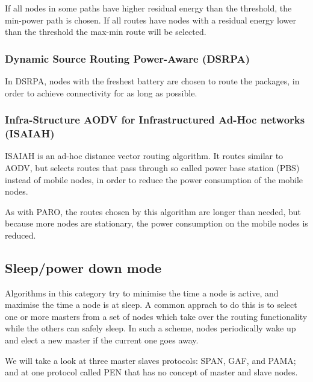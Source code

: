 \documentclass[conference]{IEEEtran}
\begin{document}
If all nodes in some paths have higher residual energy than the threshold,
the min-power path is chosen.
If all routes have nodes with a residual energy lower than the threshold the
max-min route will be selected.

\subsubsection{Dynamic Source Routing Power-Aware (DSRPA)}
In DSRPA\cite{djenouri2006dynamic}, nodes with the freshest battery are
chosen to route the packages, in order to achieve connectivity for as
long as possible.\cite{alotaibi2012survey}

\subsubsection{Infra-Structure AODV for Infrastructured Ad-Hoc networks (ISAIAH)}
ISAIAH\cite{lindgren2002infrastructured} is an ad-hoc distance vector routing
algorithm. It routes similar to AODV, but selects routes that pass through
so called power base station (PBS) instead of mobile nodes, in order to reduce
the power consumption of the mobile nodes.

As with PARO, the routes chosen by this algorithm are longer than needed, but
because more nodes are stationary, the power consumption on the mobile nodes
is reduced.

\subsection{Sleep/power­ down mode}
Algorithms in this category try to minimise the time a node is active, and
maximise the time a node is at sleep. A common apprach to do this is to select
one or more masters from a set of nodes which take over the routing functionality
while the others can safely sleep. In such a scheme, nodes periodically wake up
and elect a new master if the current one goes away.

We will take a look at three master slaves protocols: SPAN, GAF, and PAMA;
and at one protocol called PEN that has no concept of master and slave nodes.
\end{document}

